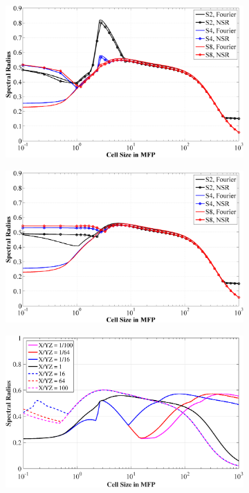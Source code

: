 \documentclass[11pt]{article}
\begin{document}
\begin{figure}[hbt]
\centering
	\begin{subfigure}[b]{0.48\textwidth}
		\centering
		\includegraphics[width=\textwidth]{figures/SI_MIP_hex_C=1_LS2,4,8_F&NSR_PDT.png}
	\end{subfigure}
	\hfill
	\begin{subfigure}[b]{0.48\textwidth}
		\centering
		\includegraphics[width=\textwidth]{figures/SI_MIP_hex_C=4_LS2,4,8_F&NSR_PDT.png}
	\end{subfigure}
	\vfill
	\begin{subfigure}[b]{0.48\textwidth}
		\centering
		\includegraphics[width=\textwidth]{figures/SI_MIP_hex_LS8_C=1_AR.eps}

\end{subfigure}
\end{figure}
\end{document}
